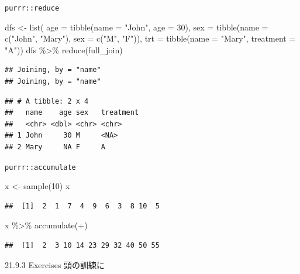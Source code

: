 \documentclass[
  ignorenonframetext,
  aspectratio=169]{beamer}
\newenvironment{Shaded}{\begin{snugshade}}{\end{snugshade}}
\newcommand{\AttributeTok}[1]{\textcolor[rgb]{0.77,0.63,0.00}{#1}}
\newcommand{\DecValTok}[1]{\textcolor[rgb]{0.00,0.00,0.81}{#1}}
\newcommand{\FunctionTok}[1]{\textcolor[rgb]{0.00,0.00,0.00}{#1}}
\newcommand{\NormalTok}[1]{#1}
\newcommand{\OtherTok}[1]{\textcolor[rgb]{0.56,0.35,0.01}{#1}}
\newcommand{\SpecialCharTok}[1]{\textcolor[rgb]{0.00,0.00,0.00}{#1}}
\newcommand{\StringTok}[1]{\textcolor[rgb]{0.31,0.60,0.02}{#1}}
\begin{document}
\begin{frame}[fragile]{\texttt{purrr::reduce}}
\protect\hypertarget{purrrreduce}{}
\begin{Shaded}
\begin{Highlighting}[]
\NormalTok{dfs }\OtherTok{\textless{}{-}} \FunctionTok{list}\NormalTok{( }\AttributeTok{age =} \FunctionTok{tibble}\NormalTok{(}\AttributeTok{name =} \StringTok{"John"}\NormalTok{, }\AttributeTok{age =} \DecValTok{30}\NormalTok{),}
        \AttributeTok{sex =} \FunctionTok{tibble}\NormalTok{(}\AttributeTok{name =} \FunctionTok{c}\NormalTok{(}\StringTok{"John"}\NormalTok{, }\StringTok{"Mary"}\NormalTok{), }\AttributeTok{sex =} \FunctionTok{c}\NormalTok{(}\StringTok{"M"}\NormalTok{, }\StringTok{"F"}\NormalTok{)),}
        \AttributeTok{trt =} \FunctionTok{tibble}\NormalTok{(}\AttributeTok{name =} \StringTok{"Mary"}\NormalTok{, }\AttributeTok{treatment =} \StringTok{"A"}\NormalTok{))}
\NormalTok{dfs }\SpecialCharTok{\%\textgreater{}\%} \FunctionTok{reduce}\NormalTok{(full\_join)}
\end{Highlighting}
\end{Shaded}

\begin{verbatim}
## Joining, by = "name"
## Joining, by = "name"
\end{verbatim}

\begin{verbatim}
## # A tibble: 2 x 4
##   name    age sex   treatment
##   <chr> <dbl> <chr> <chr>    
## 1 John     30 M     <NA>     
## 2 Mary     NA F     A
\end{verbatim}
\end{frame}

\begin{frame}[fragile]{\texttt{purrr::accumulate}}
\protect\hypertarget{purrraccumulate}{}
\begin{Shaded}
\begin{Highlighting}[]
\NormalTok{x }\OtherTok{\textless{}{-}} \FunctionTok{sample}\NormalTok{(}\DecValTok{10}\NormalTok{)}
\NormalTok{x}
\end{Highlighting}
\end{Shaded}

\begin{verbatim}
##  [1]  2  1  7  4  9  6  3  8 10  5
\end{verbatim}

\begin{Shaded}
\begin{Highlighting}[]
\NormalTok{x }\SpecialCharTok{\%\textgreater{}\%} \FunctionTok{accumulate}\NormalTok{(}\StringTok{\textasciigrave{}}\AttributeTok{+}\StringTok{\textasciigrave{}}\NormalTok{)}
\end{Highlighting}
\end{Shaded}

\begin{verbatim}
##  [1]  2  3 10 14 23 29 32 40 50 55
\end{verbatim}
\end{frame}

\begin{frame}{21.9.3 Exercises}
\protect\hypertarget{exercises-4}{}
頭の訓練に
\end{frame}
\end{document}
